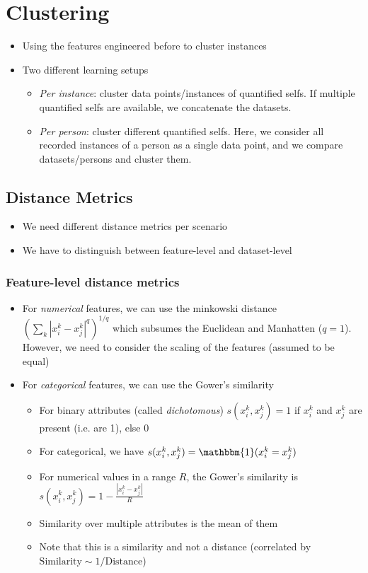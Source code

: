 \section{Clustering}
\begin{itemize}
	\item Using the features engineered before to cluster instances
	\item Two different learning setups
	\begin{itemize}
		\item \textit{Per instance}: cluster data points/instances of quantified selfs. If multiple quantified selfs are available, we concatenate the datasets.
		\item \textit{Per person}: cluster different quantified selfs. Here, we consider all recorded instances of a person as a single data point, and we compare datasets/persons and cluster them. 
	\end{itemize}
\end{itemize}
\subsection{Distance Metrics}
\begin{itemize}
	\item We need different distance metrics per scenario
	\item We have to distinguish between feature-level and dataset-level
\end{itemize}
\subsubsection{Feature-level distance metrics}
\begin{itemize}
	\item For \textit{numerical} features, we can use the minkowski distance $\left(\sum_k \left|x_i^k - x_j^k\right|^q\right)^{1/q}$ which subsumes the Euclidean and Manhatten ($q=1$). However, we need to consider the scaling of the features (assumed to be equal)
	\item For \textit{categorical} features, we can use the Gower's similarity
	\begin{itemize}
		\item For binary attributes (called \textit{dichotomous}) $s(x_i^k, x_j^k)=1$ if $x_i^k$ and $x_j^k$ are present (i.e. are 1), else 0
		\item For categorical, we have $s(x_i^k, x_j^k)=\mathbbm{1}(x_i^k = x_j^k)$
		\item For numerical values in a range $R$, the Gower's similarity is $s(x_i^k, x_j^k)=1 - \frac{|x_i^k - x_j^k|}{R}$
		\item Similarity over multiple attributes is the mean of them
		\item Note that this is a similarity and not a distance (correlated by $\text{Similarity}\sim1/\text{Distance}$)
	\end{itemize}
\end{itemize}

